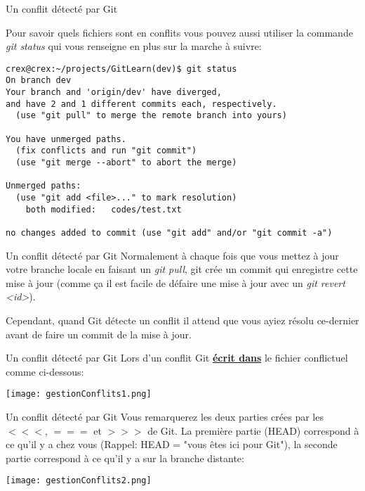 \documentclass{beamer}
\begin{document}
\begin{frame}[fragile]{Un conflit détecté par Git}

Pour savoir quels fichiers sont en conflits vous pouvez aussi utiliser la commande \textit{git status} qui vous renseigne en plus sur la marche à suivre:
\begin{mdframed}[style=Bash]
\begin{lstlisting}[style=Bash, caption=Les fichiers en conflit indiqués par git status]
crex@crex:~/projects/GitLearn(dev)$ git status
On branch dev
Your branch and 'origin/dev' have diverged,
and have 2 and 1 different commits each, respectively.
  (use "git pull" to merge the remote branch into yours)

You have unmerged paths.
  (fix conflicts and run "git commit")
  (use "git merge --abort" to abort the merge)

Unmerged paths:
  (use "git add <file>..." to mark resolution)
	both modified:   codes/test.txt

no changes added to commit (use "git add" and/or "git commit -a")
\end{lstlisting}
\end{mdframed}
\end{frame}

\begin{frame}{Un conflit détecté par Git}
Normalement à chaque fois que vous mettez à jour votre branche locale en faisant un \textit{git pull}, git crée un commit qui enregistre cette mise à jour (comme ça il est facile de défaire une mise à jour avec un \textit{git revert <id>}).\\
\medskip

Cependant, quand Git détecte un conflit il attend que vous ayiez résolu ce-dernier avant de faire un commit de la mise à jour.
\end{frame}

\begin{frame}[fragile]{Un conflit détecté par Git}
Lors d'un conflit Git \textbf{\underline{écrit dans}} le fichier conflictuel comme ci-dessous:
\smallskip
\begin{center}
	\texttt{[image: gestionConflits1.png]}
\end{center}
\end{frame}

\begin{frame}[fragile]{Un conflit détecté par Git}
Vous remarquerez les deux parties crées par les $<<<$, $===$ et $>>>$ de Git. La première partie (HEAD) correspond à ce qu'il y a chez vous (Rappel: HEAD = "vous êtes ici pour Git"), la seconde partie correspond à ce qu'il y a sur la branche distante:
\smallskip
\begin{center}
	\texttt{[image: gestionConflits2.png]}
\end{center}
\end{frame}
\end{document}
